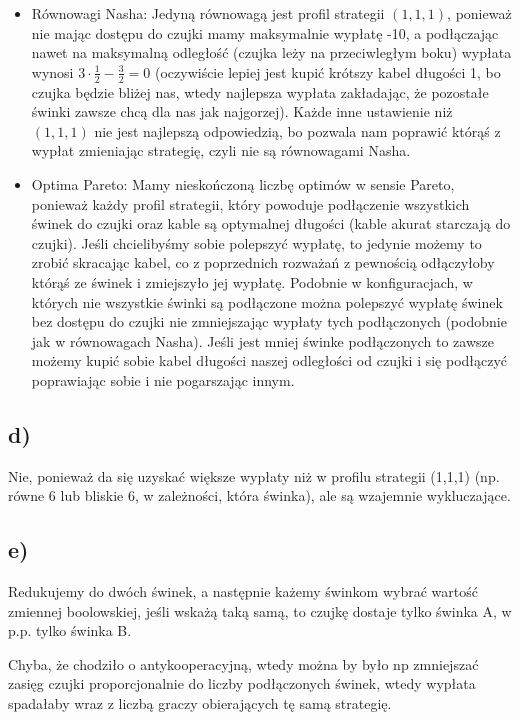 \documentclass{article}
\begin{document}
\begin{itemize}
    \item Równowagi Nasha: Jedyną równowagą jest profil strategii $(1,1,1)$, ponieważ nie mając dostępu do czujki mamy maksymalnie wypłatę -10, a podłączając nawet na maksymalną odległość (czujka leży na przeciwległym boku) wypłata wynosi $3 \cdot \frac{1}{2} - \frac{3}{2} = 0$ (oczywiście lepiej jest kupić krótszy kabel długości 1, bo czujka będzie bliżej nas, wtedy najlepsza wypłata zakładając, że pozostałe świnki zawsze chcą dla nas jak najgorzej). Każde inne ustawienie niż $(1,1,1)$ nie jest najlepszą odpowiedzią, bo pozwala nam poprawić którąś z wypłat zmieniając strategię, czyli nie są równowagami Nasha.
    \item Optima Pareto: Mamy nieskończoną liczbę optimów w sensie Pareto, ponieważ każdy profil strategii, który powoduje podłączenie wszystkich świnek do czujki oraz kable są optymalnej długości (kable akurat starczają do czujki). Jeśli chcielibyśmy sobie polepszyć wypłatę, to jedynie możemy to zrobić skracając kabel, co z poprzednich rozważań z pewnością odłączyłoby którąś ze świnek i zmiejszyło jej wypłatę. Podobnie w konfiguracjach, w których nie wszystkie świnki są podłączone można polepszyć wypłatę świnek bez dostępu do czujki nie zmniejszając wypłaty tych podłączonych (podobnie jak w równowagach Nasha). Jeśli jest mniej świnke podłączonych to zawsze możemy kupić sobie kabel długości naszej odległości od czujki i się podłączyć poprawiając sobie i nie pogarszając innym.
\end{itemize}

\subsection*{d)}

Nie, ponieważ da się uzyskać większe wypłaty niż w profilu strategii (1,1,1) (np. równe 6 lub bliskie 6, w zależności, która świnka), ale są wzajemnie wykluczające.

\subsection*{e)}

Redukujemy do dwóch świnek, a następnie każemy świnkom wybrać wartość zmiennej boolowskiej, jeśli wskażą taką samą, to czujkę dostaje tylko świnka A, w p.p. tylko świnka B.

Chyba, że chodziło o antykooperacyjną, wtedy można by było np zmniejszać zasięg czujki proporcjonalnie do liczby podłączonych świnek, wtedy wypłata spadałaby wraz z liczbą graczy obierających tę samą strategię.
\end{document}
